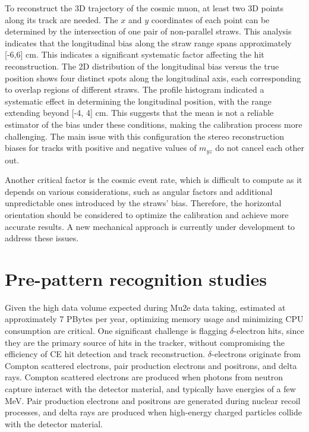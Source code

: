 To reconstruct the 3D trajectory of the cosmic muon, at least 
two 3D points along its track are needed. The $x$ and $y$ coordinates 
of each point can be determined by the intersection of one pair of 
non-parallel straws. This analysis indicates that the longitudinal bias along the straw 
range spans approximately [-6,6] cm. This indicates a significant systematic factor 
affecting the hit reconstruction. 
The 2D distribution of the longitudinal bias versus the 
true position shows four distinct spots along the longitudinal axis, each corresponding 
to overlap regions of different straws. The profile histogram indicated a systematic effect in determining 
the longitudinal position, with the range extending beyond [-4, 4] cm. 
This suggests that the mean is not a reliable estimator of the bias under 
these conditions, making the calibration process more challenging.
The main issue with this configuration the stereo 
reconstruction biases for tracks with positive and negative values of $m_{yz}$ do not cancel each other out. 

Another critical factor is the cosmic event rate, which is 
difficult to compute as it depends on various considerations, 
such as angular factors and additional unpredictable ones 
introduced by the straws' bias. Therefore, the horizontal orientation 
should be considered to optimize the calibration and achieve more 
accurate results. A new mechanical approach is currently under development to address these issues.


\section{Pre-pattern recognition studies}

Given the high data volume expected during Mu2e data taking, 
estimated at approximately 7 PBytes per year, optimizing memory usage 
and minimizing CPU consumption are critical. One significant challenge 
is flagging $\delta$-electron hits, since they are the primary source 
of hits in the tracker, without compromising the efficiency of 
CE hit detection and 
track reconstruction. $\delta$-electrons originate from Compton 
scattered electrons, 
pair production electrons and positrons, and delta rays. Compton 
scattered electrons 
are produced when photons from neutron capture interact with the 
detector material, and  
typically have energies of a few MeV. Pair production electrons 
and positrons 
are generated during nuclear recoil processes, and delta rays are produced 
when high-energy charged particles collide with the detector material.

